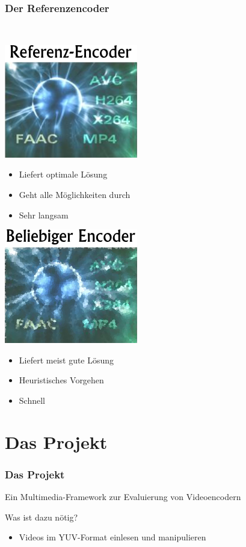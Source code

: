 \documentclass[t]{beamer}
\begin{document}
\begin{frame}
	\frametitle{Der Referenzencoder}
	~\\
	\begin{minipage}{5.3cm}
		\includegraphics[scale=.5]{ref.png}
		~\\
		\begin{itemize}
			\item<2-> Liefert optimale Lösung
			\item<4-> Geht alle Möglichkeiten durch
			\item<5-> Sehr langsam
		\end{itemize}
	\end{minipage}
	\hfill	
	\begin{minipage}{4.7cm}
		\includegraphics[scale=.5]{beliebig.png}
		~\\
		\begin{itemize}
			\item<3-> Liefert meist gute Lösung
			\item<6-> Heuristisches Vorgehen
			\item<7-> Schnell
			
		\end{itemize}
	\end{minipage}
\end{frame}

\section{Das Projekt}
\begin{frame}
	\frametitle{Das Projekt}
	\begin{center}
		Ein Multimedia-Framework zur Evaluierung von Videoencodern	
	\end{center}
	 Was ist dazu nötig? \newline
	\begin{itemize}
		\item<3-> Videos im YUV-Format einlesen und manipulieren
	\end{itemize}
\end{frame}
\end{document}
